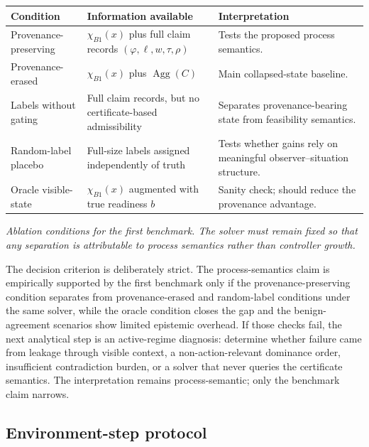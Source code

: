 \documentclass[11pt]{article}
\newcommand{\Agg}{\operatorname{Agg}}
\newcommand{\1}{\mathbf{1}}
\theoremstyle{definition}
\theoremstyle{plain}
\theoremstyle{remark}
\begin{document}
\begin{center}
\small
\begin{tabularx}{\textwidth}{>{\raggedright\arraybackslash}p{}>{\raggedright\arraybackslash}p{}X}
\toprule
\textbf{Condition} & \textbf{Information available} & \textbf{Interpretation} \\
\midrule
Provenance-preserving & $\chi_{B1}(x)$ plus full claim records $(\varphi,\ell,w,\tau,\rho)$ & Tests the proposed process semantics. \\
Provenance-erased & $\chi_{B1}(x)$ plus $\Agg(C)$ & Main collapsed-state baseline. \\
Labels without gating & Full claim records, but no certificate-based admissibility & Separates provenance-bearing state from feasibility semantics. \\
Random-label placebo & Full-size labels assigned independently of truth & Tests whether gains rely on meaningful observer--situation structure. \\
Oracle visible-state & $\chi_{B1}(x)$ augmented with true readiness $b$ & Sanity check; should reduce the provenance advantage. \\
\bottomrule
\end{tabularx}
\par\vspace{0.25em}
{\small\emph{Ablation conditions for the first benchmark. The solver must remain fixed so that any separation is attributable to process semantics rather than controller growth.}}
\end{center}

The decision criterion is deliberately strict. The process-semantics claim is empirically supported by the first benchmark only if the provenance-preserving condition separates from provenance-erased and random-label conditions under the same solver, while the oracle condition closes the gap and the benign-agreement scenarios show limited epistemic overhead. If those checks fail, the next analytical step is an active-regime diagnosis: determine whether failure came from leakage through visible context, a non-action-relevant dominance order, insufficient contradiction burden, or a solver that never queries the certificate semantics. The interpretation remains process-semantic; only the benchmark claim narrows.

\subsection{Environment-step protocol}
\label{supp:subsec:b1-step-protocol}
\end{document}
